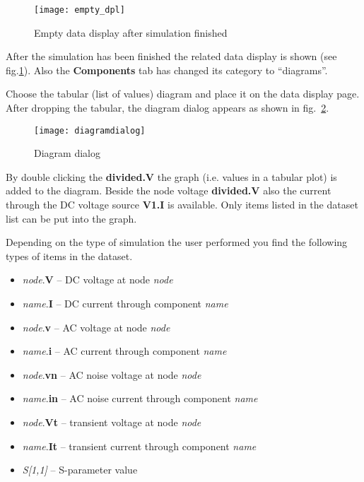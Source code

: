 \begin{figure}[ht]
  \centering
  \texttt{[image: empty\_dpl]}
  \caption{Empty data display after simulation finished}
  \label{fig:empty_dpl}
\end{figure}
\FloatBarrier

After the simulation has been finished the related data display is
shown (see fig.\ref{fig:empty_dpl}).  Also the \textbf{Components} tab
has changed its category to ``diagrams''.


Choose the tabular (list of values) diagram and place it on the data
display page.  After dropping the tabular, the diagram dialog appears
as shown in fig.~\ref{fig:diagramdialog}.

\begin{figure}[ht]
  \centering
  \texttt{[image: diagramdialog]}
  \caption{Diagram dialog}
  \label{fig:diagramdialog}
\end{figure}
\FloatBarrier

By double clicking the \textbf{divided.V} the graph (i.e. values in a
tabular plot) is added to the diagram.  Beside the node voltage
\textbf{divided.V} also the current through the DC voltage source
\textbf{V1.I} is available.  Only items listed in the dataset list can
be put into the graph.


Depending on the type of simulation the user performed you find the
following types of items in the dataset.
\begin{itemize}
\item \textit{node}.\textbf{V} -- DC voltage at node \textit{node}
\item \textit{name}.\textbf{I} -- DC current through component \textit{name}
\item \textit{node}.\textbf{v} -- AC voltage at node \textit{node}
\item \textit{name}.\textbf{i} -- AC current through component \textit{name}
\item \textit{node}.\textbf{vn} -- AC noise voltage at node \textit{node}
\item \textit{name}.\textbf{in} -- AC noise current through component \textit{name}
\item \textit{node}.\textbf{Vt} -- transient voltage at node \textit{node}
\item \textit{name}.\textbf{It} -- transient current through component \textit{name}
\item \textit{S[1,1]} -- S-parameter value
\end{itemize}

